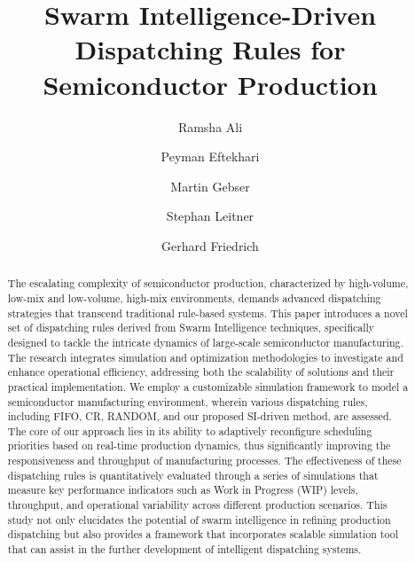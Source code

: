 \documentclass[runningheads]{llncs}
\begin{document}
%
\title{Swarm Intelligence-Driven Dispatching Rules for Semiconductor Production
}
%
%
\author{Ramsha Ali \and
Peyman Eftekhari \and
Martin Gebser \and
Stephan Leitner \and
Gerhard Friedrich
}
%
%

%
\maketitle              %
%
\begin{abstract}
The escalating complexity of semiconductor production, characterized by high-volume, low-mix and low-volume, high-mix environments, demands advanced dispatching strategies that transcend traditional rule-based systems. This paper introduces a novel set of dispatching rules derived from Swarm Intelligence techniques, specifically designed to tackle the intricate dynamics of large-scale semiconductor manufacturing. The research integrates simulation and optimization methodologies to investigate and enhance operational efficiency, addressing both the scalability of solutions and their practical implementation. We employ a customizable simulation framework to model a semiconductor manufacturing environment, wherein various dispatching rules, including FIFO, CR, RANDOM, and our proposed SI-driven method, are assessed. The core of our approach lies in its ability to adaptively reconfigure scheduling priorities based on real-time production dynamics, thus significantly improving the responsiveness and throughput of manufacturing processes.
The effectiveness of these dispatching rules is quantitatively evaluated through a series of simulations that measure key performance indicators such as Work in Progress (WIP) levels, throughput, and operational variability across different production scenarios.
This study not only elucidates the potential of swarm intelligence in refining production dispatching but also provides a framework that incorporates scalable simulation tool that can assist in the further development of intelligent dispatching systems. 

\end{abstract}
%
%
%
\end{document}
